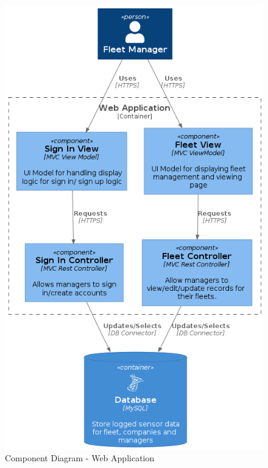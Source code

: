 \begin{figure}
\centering
\includegraphics[scale=0.6]{webapp_component.png}
\caption{Component Diagram - Web Application}
\label{fig:webapp_component}
\end{figure}
